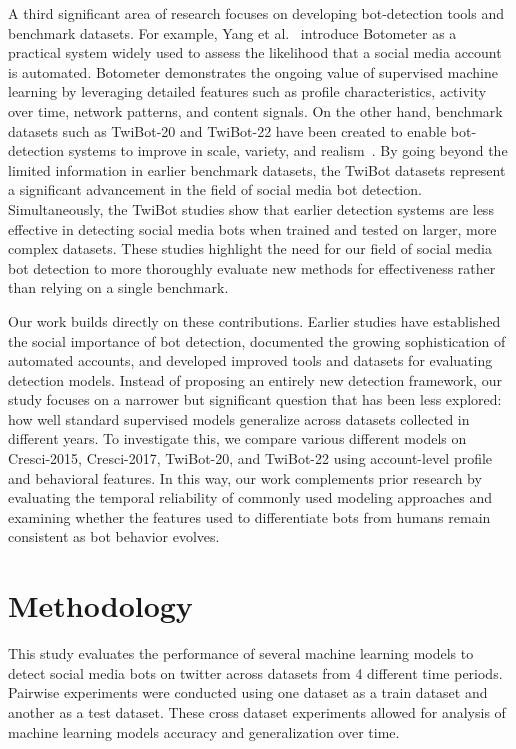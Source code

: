 A third significant area of research focuses on developing bot-detection tools and benchmark datasets. For example, Yang et al.~\cite{yang2022botometer} introduce Botometer as a practical system widely used to assess the likelihood that a social media account is automated. Botometer demonstrates the ongoing value of supervised machine learning by leveraging detailed features such as profile characteristics, activity over time, network patterns, and content signals. On the other hand, benchmark datasets such as TwiBot-20 and TwiBot-22 have been created to enable bot-detection systems to improve in scale, variety, and realism~\cite{feng2021twibot20, feng2022twibot22}. By going beyond the limited information in earlier benchmark datasets, the TwiBot datasets represent a significant advancement in the field of social media bot detection. Simultaneously, the TwiBot studies show that earlier detection systems are less effective in detecting social media bots when trained and tested on larger, more complex datasets. These studies highlight the need for our field of social media bot detection to more thoroughly evaluate new methods for effectiveness rather than relying on a single benchmark.

Our work builds directly on these contributions. Earlier studies have established the social importance of bot detection, documented the growing sophistication of automated accounts, and developed improved tools and datasets for evaluating detection models. Instead of proposing an entirely new detection framework, our study focuses on a narrower but significant question that has been less explored: how well standard supervised models generalize across datasets collected in different years. To investigate this, we compare various different models on Cresci-2015, Cresci-2017, TwiBot-20, and TwiBot-22 using account-level profile and behavioral features. In this way, our work complements prior research by evaluating the temporal reliability of commonly used modeling approaches and examining whether the features used to differentiate bots from humans remain consistent as bot behavior evolves.

\section{Methodology}\label{sec:method}
This study evaluates the performance of several machine learning models to detect social media bots on twitter across datasets from 4 different time periods. Pairwise experiments were conducted using one dataset as a train dataset and another as a test dataset. These cross dataset experiments allowed for analysis of machine learning models accuracy and generalization over time.

